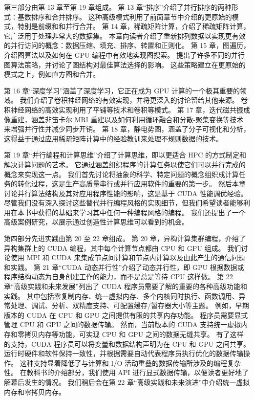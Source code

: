 第三部分由第 13 章至第 19 章组成。 第 13 章“排序”介绍了并行排序的两种形式：基数排序和合并排序。 这种高级模式利用了前面章节中介绍的更原始的模式，特别是前缀和和并行合并。 第 14 章，稀疏矩阵计算，介绍了稀疏矩阵计算，它广泛用于处理非常大的数据集。 本章向读者介绍了重新排列数据以实现更有效的并行访问的概念：数据压缩、填充、排序、转置和正则化。 第 15 章，图遍历，介绍图算法以及如何在 GPU 编程中有效地实现图搜索。 提出了许多不同的并行图算法策略，并讨论了图结构对最佳算法选择的影响。 这些策略建立在更原始的模式之上，例如直方图和合并。

第 16 章“深度学习”涵盖了深度学习，它正在成为 GPU 计算的一个极其重要的领域。 我们介绍了卷积神经网络的有效实现，并将更深入的讨论留给其他来源。 卷积神经网络的高效实现利用了平铺等技术和卷积等模式。 第 17 章，迭代磁共振成像重建，涵盖非笛卡尔 MRI 重建以及如何利用循环融合和分散-聚集变换等技术来增强并行性并减少同步开销。 第 18 章，静电势图，涵盖了分子可视化和分析，这得益于通过应用稀疏矩阵计算中的经验教训来处理不规则数据的技术。

第 19 章“并行编程和计算思维”介绍了计算思维，即以更适合 HPC 的方式制定和解决计算问题的艺术。 它通过涵盖组织程序的计算任务以使它们可以并行完成的概念来实现这一点。 我们首先讨论将抽象的科学、特定问题的概念组织成计算任务的转化过程，这是生产高质量串行或并行应用软件的重要的第一步。 然后本章讨论并行算法结构及其对应用程序性能的影响，这是基于 CUDA 性能调优经验。 尽管我们没有深入探讨这些替代并行编程风格的实现细节，但我们希望读者能够利用在本书中获得的基础来学习其中任何一种编程风格的编程。 我们还提出了一个高级案例研究，以展示通过创造性计算思维可以看到的机会。

第四部分先进实践由第 20 至 22 章组成。 第 20 章，异构计算集群编程，介绍了异构集群上的 CUDA 编程，其中每个计算节点都由 CPU 和 GPU 组成。 我们讨论使用 MPI 和 CUDA 来集成节点间计算和节点内计算以及由此产生的通信问题和实践。 第 21 章“CUDA 动态并行性”介绍了动态并行性，即 GPU 根据数据或程序结构动态为自身创建工作的能力，而不是总是等待 CPU 这样做。 第 22 章“高级实践和未来发展”列出了 CUDA 程序员需要了解的重要的各种高级功能和实践。 其中包括零复制内存、统一虚拟内存、多个内核同时执行、函数调用、异常处理、调试、分析、双精度支持、可配置缓存/暂存器大小等主题。 例如，早期版本的 CUDA 在 CPU 和 GPU 之间提供有限的共享内存功能。 程序员需要显式管理 CPU 和 GPU 之间的数据传输。 然而，当前版本的 CUDA 支持统一虚拟内存和零拷贝内存等功能，可实现 CPU 和 GPU 之间的数据无缝共享。 有了这样的支持，CUDA 程序员可以将变量和数据结构声明为在 CPU 和 GPU 之间共享。 运行时硬件和软件保持一致性，并根据需要自动代表程序员执行优化的数据传输操作。 这种支持显着降低了与计算和 I/O 活动重叠的数据传输所涉及的编程复杂性。 在教科书的介绍部分，我们使用 API 进行显式数据传输，以便读者更好地了解幕后发生的情况。 我们稍后会在第 22 章“高级实践和未来演进”中介绍统一虚拟内存和零拷贝内存。

